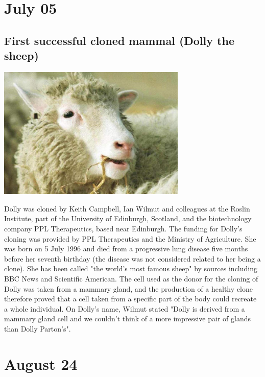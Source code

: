 \documentclass[11pt]{report}
\begin{document}
\section{July 05}
\subsection{First successful cloned mammal (Dolly the sheep)}
\vspace{2mm}\begin{center}\includegraphics[width=9cm]{./img/dollySheep.jpg}\end{center}
Dolly was cloned by Keith Campbell, Ian Wilmut and colleagues at the Roslin Institute, part of the University of Edinburgh, Scotland, and the biotechnology company PPL Therapeutics, based near Edinburgh. The funding for Dolly's cloning was provided by PPL Therapeutics and the Ministry of Agriculture. She was born on 5 July 1996 and died from a progressive lung disease five months before her seventh birthday (the disease was not considered related to her being a clone). She has been called "the world's most famous sheep" by sources including BBC News and Scientific American.
The cell used as the donor for the cloning of Dolly was taken from a mammary gland, and the production of a healthy clone therefore proved that a cell taken from a specific part of the body could recreate a whole individual. On Dolly's name, Wilmut stated "Dolly is derived from a mammary gland cell and we couldn't think of a more impressive pair of glands than Dolly Parton's".
\section{August 24}
\end{document}

